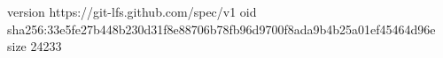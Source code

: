 version https://git-lfs.github.com/spec/v1
oid sha256:33e5fe27b448b230d31f8e88706b78fb96d9700f8ada9b4b25a01ef45464d96e
size 24233
